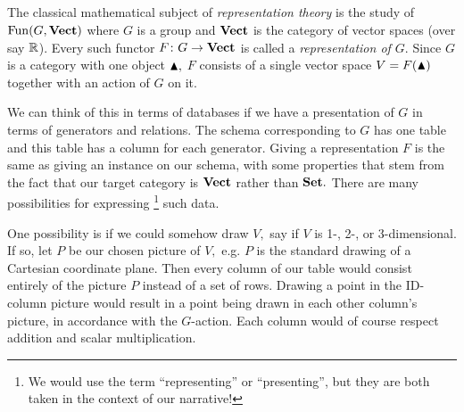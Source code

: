 \documentclass[CT4S-EN-RU]{subfiles}
\begin{document}
\begin{exerciseRUS}   
\end{exerciseRUS}


\subsection{}


\subsubsection{}\label{ex:reps of groups}

\begin{blockENG}
The classical mathematical subject of {\em representation theory} is the study of $\operatorname{Fun}(G,{\mathbf{Vect}})$ where $G$ is a group and ${\mathbf{Vect}}$ is the category of vector spaces (over say ${\mathbb R}$). Every such functor $F\colon G\rightarrow{\mathbf{Vect}}$ is called a {\em representation of $G$}. Since $G$ is a category with one object $\blacktriangle,$ $F$ consists of a single vector space $V=F(\blacktriangle)$ together with an action of $G$ on it. 
\end{blockENG}

\begin{blockRUS}
\end{blockRUS}

\begin{blockENG}
We can think of this in terms of databases if we have a presentation of $G$ in terms of generators and relations. The schema corresponding to $G$ has one table and this table has a column for each generator. Giving a representation $F$ is the same as giving an instance on our schema, with some properties that stem from the fact that our target category is ${\mathbf{Vect}}$ rather than ${\mathbf{Set}}.$ There are many possibilities for expressing
\footnote{We would use the term “representing” or “presenting”, but they are both taken in the context of our narrative!}
such data.
\end{blockENG}

\begin{blockRUS}
\end{blockRUS}

\begin{blockENG}
One possibility is if we could somehow draw $V,$ say if $V$ is 1-, 2-, or 3-dimensional. If so, let $P$ be our chosen picture of $V,$ e.g. $P$ is the standard drawing of a Cartesian coordinate plane. Then every column of our table would consist entirely of the picture $P$ instead of a set of rows. Drawing a point in the ID-column picture would result in a point being drawn in each other column's picture, in accordance with the $G$-action. Each column would of course respect addition and scalar multiplication.
\end{blockENG}
\end{document}
